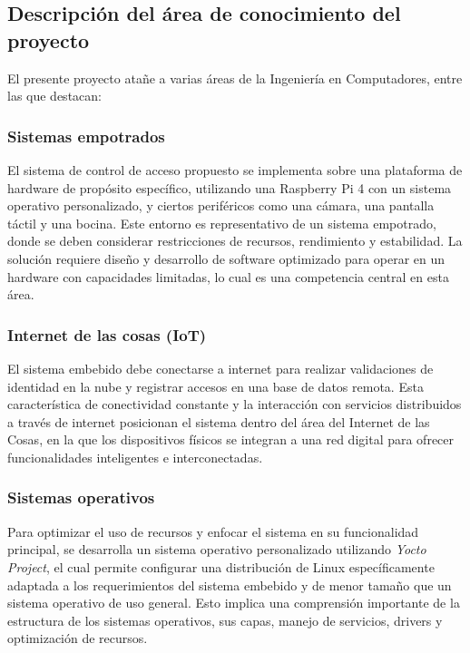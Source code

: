 \subsection{Descripción del área de conocimiento del proyecto}
El presente proyecto atañe a varias áreas de la Ingeniería en Computadores, entre las que destacan:

\subsubsection{Sistemas empotrados}
El sistema de control de acceso propuesto se implementa sobre una plataforma de hardware de propósito específico, utilizando una Raspberry Pi 4 con un sistema operativo personalizado, y ciertos periféricos como una cámara, una pantalla táctil y una bocina. Este entorno es representativo de un sistema empotrado, donde se deben considerar restricciones de recursos, rendimiento y estabilidad. La solución requiere diseño y desarrollo de software optimizado para operar en un hardware con capacidades limitadas, lo cual es una competencia central en esta área.

\subsubsection{Internet de las cosas (IoT)}
El sistema embebido debe conectarse a internet para realizar validaciones de identidad en la nube y registrar accesos en una base de datos remota. Esta característica de conectividad constante y la interacción con servicios distribuidos a través de internet posicionan el sistema dentro del área del Internet de las Cosas, en la que los dispositivos físicos se integran a una red digital para ofrecer funcionalidades inteligentes e  interconectadas.

\subsubsection{Sistemas operativos}
Para optimizar el uso de recursos y enfocar el sistema en su funcionalidad principal, se desarrolla un sistema operativo personalizado utilizando \textit{Yocto Project}, el cual permite configurar una distribución de Linux específicamente adaptada a los requerimientos del sistema embebido y de menor tamaño que un sistema operativo de uso general. Esto implica una comprensión importante de la estructura de los sistemas operativos, sus capas, manejo de servicios, drivers y optimización de recursos.

